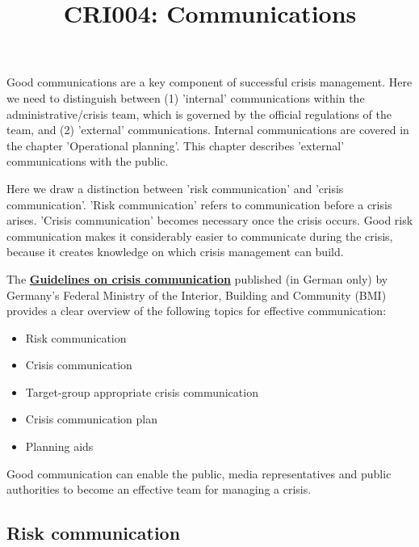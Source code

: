 \documentclass{article}
\begin{document}
\title{CRI004: Communications}

\maketitle


Good communications are a key component of successful crisis management. Here we need to distinguish between (1) 'internal' communications within the administrative/crisis team, which is governed by the official regulations of the team, and (2) 'external' communications. Internal communications are covered in the chapter 'Operational planning'. This chapter describes 'external' communications with the public.


Here we draw a distinction between 'risk communication' and 'crisis communication'. 'Risk communication' refers to communication before a crisis arises. 'Crisis communication' becomes necessary once the crisis occurs. Good risk communication makes it considerably easier to communicate during the crisis, because it creates knowledge on which crisis management can build.


The \textbf{\href{https://www.bmi.bund.de/SharedDocs/downloads/DE/publikationen/themen/bevoelkerungsschutz/leitfaden-krisenkommunikation.pdf}{Guidelines on crisis communication}} published (in German only) by Germany's Federal Ministry of the Interior, Building and Community (BMI) provides a clear overview of the following topics for effective communication:

\begin{itemize}
\item Risk communication


\item Crisis communication


\item Target-group appropriate crisis communication


\item Crisis communication plan


\item Planning aids


\end{itemize}

Good communication can enable the public, media representatives and public authorities to become an effective team for managing a crisis.


\subsection{Risk communication}\label{H9313720}
\end{document}
